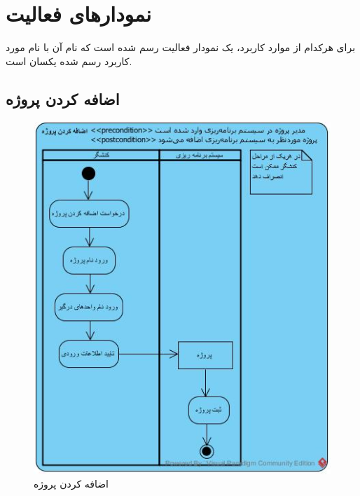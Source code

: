 \chapter{نمودارهای فعالیت}

برای هرکدام از موارد کاربرد، یک نمودار فعالیت رسم شده است که نام آن با نام مورد کاربرد رسم شده یکسان است.
\section{اضافه کردن پروژه}
\begin{figure}[H]
	\centering
	\includegraphics[scale=0.9]{img/activity/AddProjectToOrganization}
	\caption{اضافه کردن پروژه}
\end{figure}

